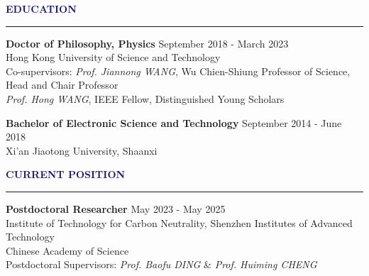 \documentclass{resume} %
\renewenvironment{rSection}[1]{
\sectionskip
\textcolor{MidnightBlue}{\MakeUppercase{#1}}
\sectionlineskip
\hrule
\begin{list}{}{
\setlength{\leftmargin}{0em}
}
\item[]
}{
\end{list}
}
\begin{document}
  


\begin{rSection}{\textbf{Education}}  %

{\bf Doctor of Philosophy, Physics} \hfill {September 2018 - March 2023}
\\ 
Hong Kong University of Science and Technology
\\ 
Co-supervisors:\textit{ Prof. Jiannong WANG}, Wu Chien-Shiung Professor of Science, Head and Chair Professor \\
\makebox[2.6cm][l]{\hspace{0pt}}\textit{ Prof. Hong WANG}, IEEE Fellow, Distinguished Young Scholars

{\bf Bachelor of Electronic Science and Technology} \hfill {September 2014 - June 2018}
\\ 
Xi'an Jiaotong University, Shaanxi 



\end{rSection} 


\begin{rSection}{\textbf{Current Position}}
{\bf Postdoctoral Researcher} \hfill {May 2023 - May 2025}
\\Institute of Technology for Carbon Neutrality, Shenzhen Institutes of Advanced Technology
\\Chinese Academy of Science
\\Postdoctoral Supervisors: \textit{Prof. Baofu DING} \& \textit{{Prof. Huiming CHENG}}

\end{rSection}
\end{document}
